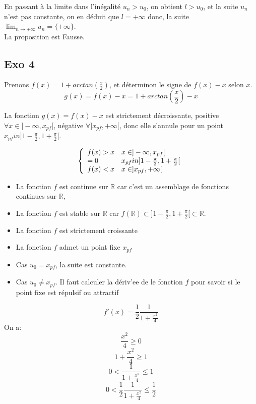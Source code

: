 \documentclass[]{book}
\theoremstyle{definition}
\newcommand{\bb}[1]{\mathbb{#1}}
\newcommand{\R}{\bb{R}}
\begin{document}
En passant \`a la limite dans l'in\'egalit\'e $u_n > u_0$, on obtient $l > u_0$, et la suite $u_n$ n'est pas constante, on en d\'eduit que $l=+\infty$ donc, la suite $\lim_{n \to +\infty} u_n = \{+\infty\}$. \\


La proposition est Fausse.

\subsection*{Exo 4}
Prenons $f(x) = 1 + arctan(\frac{x}{2})$, et d\'eterminon le signe de $f(x) - x$ selon $x$.\\
$$g(x) = f(x) - x = 1 + arctan(\frac{x}{2}) - x$$

La fonction $g(x) = f(x) - x$ est strictement d\'ecroissante, positive $\forall x \in ]-\infty,x_{pf}[$, n\'egative $\forall ]x_{pf},+\infty[$, donc elle s'annule pour un point $x_{pf} in ]1-\frac{\pi}{2}, 1+\frac{\pi}{2}[$.

$$
\left\{ 
\begin{array}{l l}
 f(x)>x & x \in ]-\infty,x_{pf}[\\
 =0 & x_{pf} in ]1-\frac{\pi}{2}, 1+\frac{\pi}{2}[\\
 f(x)<x & x \in ]x_{pf},+\infty[ \\
\end{array}
\right. 
$$

\begin{itemize} 
\item La fonction $f$ est continue sur $\R$ car c'est un assemblage de fonctions continues sur $\R$,
\item La fonction $f$ est stable sur $\R$ car $f(\R) \subset ]1-\frac{\pi}{2},1+\frac{\pi}{2}[ \subset \R$.
\item La fonction $f$ est strictement croissante
\item La fonction $f$ admet un point fixe $x_{pf}$
\end{itemize} 

\begin{itemize}
\item Cas $u_0=x_{pf}$, la suite est constante.\\
\item Cas $u_0 \neq x_{pf}$. Il faut calculer la d\'eriv'ee de le fonction $f$ pour savoir si le point fixe est r\'epulsif ou attractif
\end{itemize}

$$f'(x) = \frac{1}{2}\frac{1}{1+\frac{x^2}{4}}$$
On a:
$$\frac{x^2}{4} \geq 0$$
$$1 + \frac{x^2}{4} \geq 1$$
$$0 < \frac{1}{1+\frac{x^2}{4}} \leq 1$$
$$0 < \frac{1}{2} \frac{1}{1+\frac{x^2}{4}} \leq \frac{1}{2}$$
\end{document}
